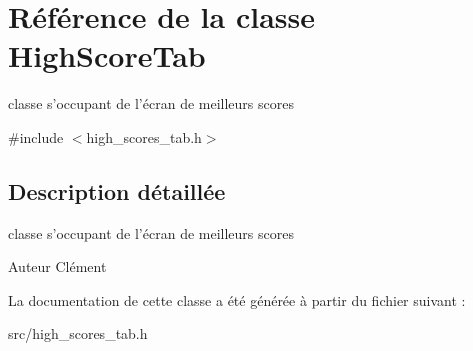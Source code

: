 \hypertarget{class_high_score_tab}{\section{Référence de la classe High\+Score\+Tab}
\label{class_high_score_tab}
}


classe s'occupant de l'écran de meilleurs scores  




{\ttfamily \#include $<$high\+\_\+scores\+\_\+tab.\+h$>$}



\subsection{Description détaillée}
classe s'occupant de l'écran de meilleurs scores 

\begin{DoxyAuthor}{Auteur}
Clément 
\end{DoxyAuthor}


La documentation de cette classe a été générée à partir du fichier suivant \+:\begin{DoxyCompactItemize}
\item 
src/high\+\_\+scores\+\_\+tab.\+h\end{DoxyCompactItemize}
